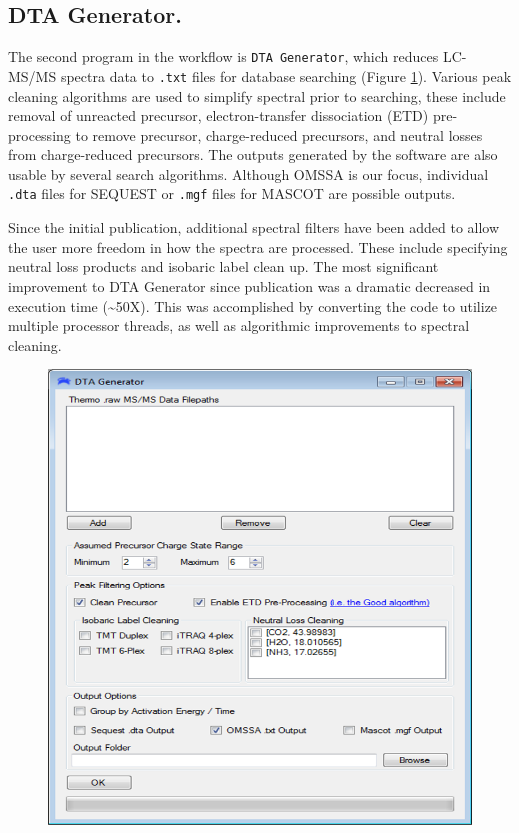 \subsection*{DTA Generator.}
The second program in the \compass{} workflow is \texttt{DTA Generator}, which reduces LC-MS/MS spectra data to \texttt{.txt} files for database searching (Figure \ref{fig:dtagenerator}). Various peak cleaning algorithms are used to simplify spectral prior to searching, these include removal of unreacted precursor, electron-transfer dissociation (ETD) pre-processing to remove precursor, charge-reduced precursors, and neutral losses from charge-reduced precursors.\cite{good} The outputs generated by the software are also usable by several search algorithms. Although OMSSA is our focus, individual \texttt{.dta} files for SEQUEST or \texttt{.mgf} files for MASCOT are possible outputs.\cite{sequest,mascot}

Since the initial publication, additional spectral filters have been added to allow the user more freedom in how the spectra are processed. These include specifying neutral loss products and isobaric label clean up. The most significant improvement to DTA Generator since publication was a dramatic decreased in execution time (\textasciitilde50X). This was accomplished by converting the code to utilize multiple processor threads, as well as algorithmic improvements to spectral cleaning. 
\begin{figure}[p]
	\centering
	\includegraphics[width=0.8\columnwidth]{csmsl/dtagenerator.png}
	\label{fig:dtagenerator}
\end{figure}


